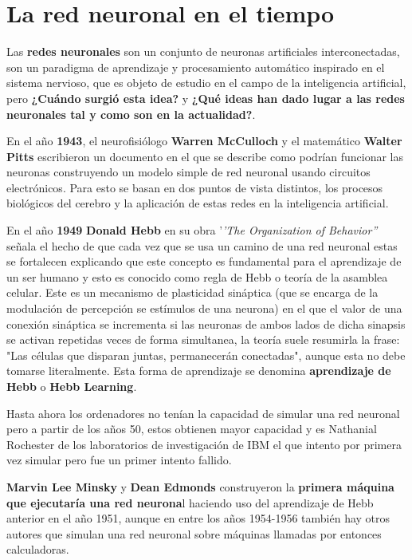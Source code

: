 \documentclass[a4paper, 11pt]{article} %
\begin{document}
\section{La red neuronal en el tiempo}
Las \textbf{redes neuronales} son un conjunto de neuronas artificiales interconectadas, son un paradigma de aprendizaje y procesamiento automático inspirado en el sistema nervioso, que es objeto de estudio en el campo de la inteligencia artificial, pero \textbf{¿Cuándo surgió esta idea?} y \textbf{¿Qué ideas han dado lugar a las redes neuronales tal y como son en la actualidad?}.

En el año \textbf{1943}, el neurofisiólogo \textbf{Warren McCulloch} y el matemático \textbf{Walter Pitts} escribieron un documento en el que se describe como podrían funcionar las neuronas construyendo un modelo simple de red neuronal usando circuitos electrónicos. Para esto se basan en dos puntos de vista distintos, los procesos biológicos del cerebro y la aplicación de estas redes en la inteligencia artificial.

En el año \textbf{1949} \textbf{Donald Hebb} en su obra '\textit{'The Organization of Behavior''} señala el hecho de que cada vez que se usa un camino de una red neuronal estas se fortalecen explicando que este concepto es fundamental para el aprendizaje de un ser humano y esto es conocido como regla de Hebb o teoría de la asamblea celular. Este es un mecanismo de plasticidad sináptica (que se encarga de la modulación de percepción se estímulos de una neurona) en el que el valor de una conexión sináptica se incrementa si las neuronas de ambos lados de dicha sinapsis se activan repetidas veces de forma simultanea, la teoría suele resumirla la frase: "Las células que disparan juntas, permanecerán conectadas", aunque esta no debe tomarse literalmente. Esta forma de aprendizaje se denomina \textbf{aprendizaje de Hebb} o \textbf{Hebb Learning}.

Hasta ahora los ordenadores no tenían la capacidad de simular una red neuronal pero a partir de los años 50, estos obtienen mayor capacidad y es Nathanial Rochester de los laboratorios de investigación de IBM el que intento por primera vez simular pero fue un primer intento fallido.

\textbf{Marvin Lee Minsky} y \textbf{Dean Edmonds} construyeron la \textbf{primera máquina que ejecutaría una red neurona}l haciendo uso del aprendizaje de Hebb anterior en el año 1951, aunque en entre los años 1954-1956 también hay otros autores que simulan una red neuronal sobre máquinas llamadas por entonces calculadoras.
\end{document}
